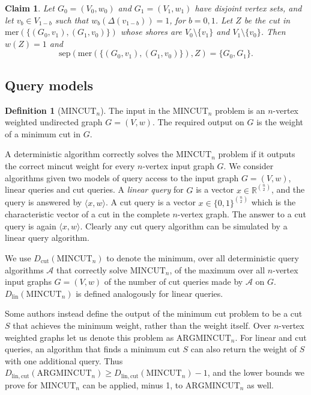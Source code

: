 \documentclass[10pt,a4paper]{article}
\newcommand{\R}{\mathbb{R}}
\newcommand{\Acal}{\mathcal{A}}
\newcommand{\MINCUT}{\mathrm{MINCUT}}
\newcommand{\ARGMINCUT}{\mathrm{ARGMINCUT}}
\newcommand{\lin}{\mathrm{lin}}
\newcommand{\cut}{\mathrm{cut}}
\newcommand{\sep}{\mathrm{sep}}
\newcommand{\mer}{\mathrm{mer}}
\newcommand{\braket}[2]{\langle#1, #2\rangle}
\newcommand{\1}{\mathbf{1}}
\newtheorem{claim}[theorem]{Claim}
\theoremstyle{definition}
\newtheorem{definition}[theorem]{Definition}
\begin{document}
\begin{claim}
\label{claim:sepmer}
Let $G_0= (V_0, w_0)$ and $ G_1 = (V_1,w_1)$ have disjoint vertex sets, and let $v_b \in V_{1-b}$ such that
$w_b(\Delta(v_{1-b})) =1$,
for $b=0,1$. Let $Z$ be the cut in $\mer( \{ (G_0, v_1), (G_1, v_0) \} )$ whose shores are
$V_0  \setminus \{v_1\}$ and $V_1 \setminus \{v_0\}$. Then $w(Z)=1$ and
$$
\sep ( \mer( \{ (G_0, v_1), (G_1, v_0) \} ), Z ) = \{ G_0, G_1 \}.
$$
\end{claim}

\subsection{Query models}
\begin{definition}[$\MINCUT_n$]
The input in the $\MINCUT_n$ problem is an $n$-vertex weighted undirected graph $G = (V,w)$.  The required output on $G$ is the weight
of a minimum cut in $G$.
\end{definition}
A deterministic algorithm correctly solves the $\MINCUT_n$ problem if it outputs the correct mincut weight for every $n$-vertex input graph $G$.
We consider algorithms given two models of query access to the input graph $G = (V,w)$, linear queries and cut queries.
A {\em linear query} for $G$ is a vector $x \in \R^{\binom{n}{2}}$,
and the query is answered by $\braket{x}{w}$.  A cut query is a vector $x \in \{0,1\}^{\binom{n}{2}}$
which is the characteristic vector of a cut in the complete $n$-vertex graph.  The answer
to a cut query is again $\braket{x}{w}$.  Clearly any cut query algorithm can be simulated by a linear
query algorithm.

We use $D_\cut(\MINCUT_n)$ to denote the minimum, over all deterministic query algorithms $\Acal$ that correctly solve $\MINCUT_n$,
of the maximum over all $n$-vertex input graphs $G = (V,w)$ of the number of cut queries made by $\Acal$ on $G$.
$D_\lin(\MINCUT_n)$ is defined analogously for linear queries.

Some authors instead define the output of the minimum cut problem to be a cut $S$ that achieves the minimum weight, rather than the weight itself.  Over $n$-vertex weighted
graphs let us denote this problem as $\ARGMINCUT_n$.  For linear and cut queries, an algorithm that finds a minimum cut $S$ can also return the weight of $S$ with one additional query.
Thus $D_{\lin, \cut}(\ARGMINCUT_n) \ge D_{\lin, \cut}(\MINCUT_n) - 1$, and the lower bounds we prove for $\MINCUT_n$ can be applied, minus 1, to $\ARGMINCUT_n$ as well.
\end{document}
